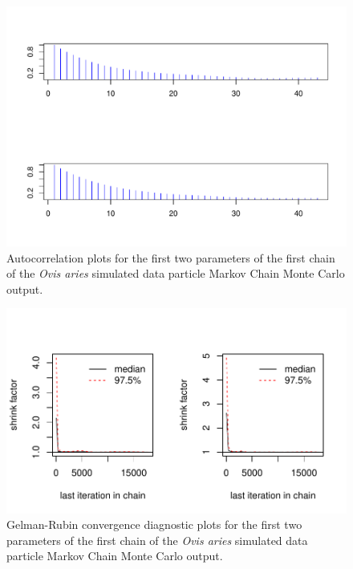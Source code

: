 \documentclass[a4paper,12pt]{article}
\begin{document}
\begin{figure}[H]
\centering
\includegraphics[scale=0.75]{chainFirst3_2.PDF}
\caption{\label{acf3}Autocorrelation plots for the first two parameters of the first chain of the \textit{Ovis aries} simulated data particle Markov Chain Monte Carlo output.}
\end{figure}

\begin{figure}[H]
\centering
\includegraphics[scale=0.9]{GRFirst2.pdf}
\caption{\label{GR3}Gelman-Rubin convergence diagnostic plots for the first two parameters of the first chain of the \textit{Ovis aries} simulated data particle Markov Chain Monte Carlo output.}
\end{figure}
\end{document}

